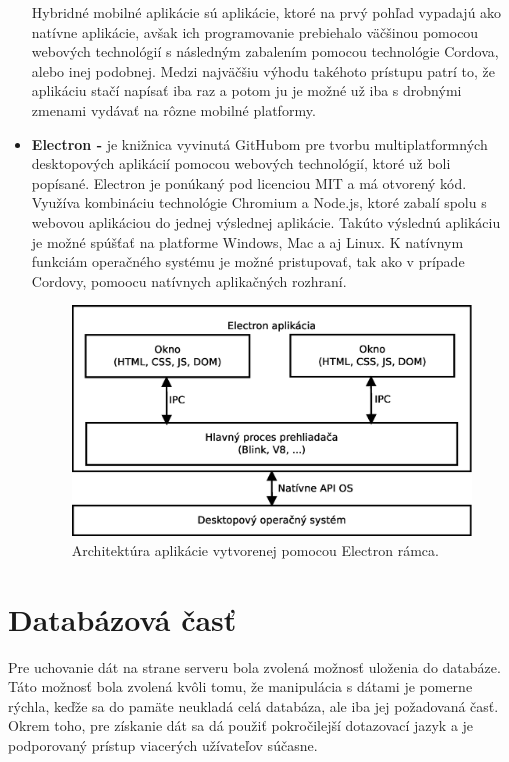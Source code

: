 \begin{itemize}
    Hybridné mobilné aplikácie sú aplikácie, ktoré na prvý pohľad vypadajú ako natívne aplikácie, avšak ich programovanie prebiehalo väčšinou pomocou webových technológií s následným zabalením pomocou technológie Cordova, alebo inej podobnej. Medzi  najväčšiu výhodu takéhoto prístupu patrí to, že aplikáciu stačí napísať iba raz a potom ju je možné už iba s drobnými zmenami vydávať na rôzne mobilné platformy.\cite{0QSW9GoG0OTJ7FKM}
    \item \textbf{Electron -} je knižnica vyvinutá GitHubom pre tvorbu multiplatformných desktopových aplikácií pomocou webových technológií, ktoré už boli popísané. Electron je ponúkaný pod licenciou MIT a má otvorený kód. Využíva kombináciu technológie Chromium a Node.js, ktoré zabalí spolu s webovou aplikáciou do jednej výslednej aplikácie. Takúto výslednú aplikáciu je možné spúšťať na platforme Windows, Mac a aj Linux. K natívnym funkciám operačného systému je možné pristupovať, tak ako v prípade Cordovy, pomoocu natívnych aplikačných rozhraní. \cite{hBGbGXxiU66nJt51}
    \begin{figure}[h]
      \centering
      \includegraphics[scale=0.40]{fig/electron.eps}
      \caption{Architektúra aplikácie vytvorenej pomocou Electron rámca.}
      \label{fig:electron}
    \end{figure}
\end{itemize}

\section{Databázová časť}
Pre uchovanie dát na strane serveru bola zvolená možnosť uloženia do databáze. Táto možnosť bola zvolená kvôli tomu, že manipulácia s dátami je pomerne rýchla, keďže sa do pamäte neukladá celá databáza, ale iba jej požadovaná časť. Okrem toho, pre získanie dát sa dá použiť pokročilejší dotazovací jazyk a je podporovaný prístup viacerých užívateľov súčasne. 

